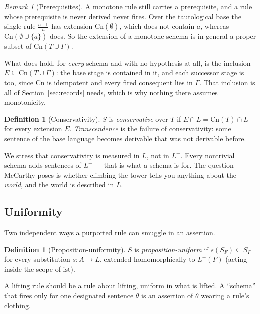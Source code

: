 \documentclass[11pt]{article}
\theoremstyle{plain}
\theoremstyle{definition}
\newtheorem{definition}[theorem]{Definition}
\theoremstyle{remark}
\newtheorem{remark}[theorem]{Remark}
\newcommand{\ist}{\mathrm{ist}}
\newcommand{\Cn}{\mathrm{Cn}}
\newcommand{\Lp}{L^{+}}
\begin{document}
\begin{remark}[Prerequisites]\label{rem:prereq}
A monotone rule still carries a prerequisite, and a rule whose prerequisite is
never derived never fires. Over the tautological base the single rule
$\frac{a\,:\,\top}{a}$ has extension $\Cn(\emptyset)$, which does not contain
$a$, whereas $\Cn(\emptyset\cup\{a\})$ does. So the extension of a monotone
schema is in general a proper subset of $\Cn(T\cup\Gamma)$.

What does hold, for \emph{every} schema and with no hypothesis at all, is the
inclusion $E\subseteq\Cn(T\cup\Gamma)$: the base stage is contained in it, and
each successor stage is too, since $\Cn$ is idempotent and every fired
consequent lies in $\Gamma$. That inclusion is all of Section~\ref{sec:records}
needs, which is why nothing there assumes monotonicity.
\end{remark}

\begin{definition}[Conservativity]
$S$ is \emph{conservative} over $T$ if $E \cap L = \Cn(T)\cap L$ for every
extension $E$. \emph{Transcendence} is the failure of conservativity: some
sentence of the base language becomes derivable that was not derivable before.
\end{definition}

We stress that conservativity is measured in $L$, not in $\Lp$. Every nontrivial
schema adds sentences of $\Lp$ --- that is what a schema is for. The question
McCarthy poses is whether climbing the tower tells you anything about the
\emph{world}, and the world is described in $L$.

\subsection{Uniformity}

Two independent ways a purported rule can smuggle in an assertion.

\begin{definition}[Proposition-uniformity]
$S$ is \emph{proposition-uniform} if $s(S_F) \subseteq S_F$ for every
substitution $s \colon A \to L$, extended homomorphically to $\Lp(F)$ (acting
inside the scope of $\ist$).
\end{definition}

A lifting rule should be a rule about lifting, uniform in what is lifted. A
``schema'' that fires only for one designated sentence $\theta$ is an assertion
of $\theta$ wearing a rule's clothing.
\end{document}
